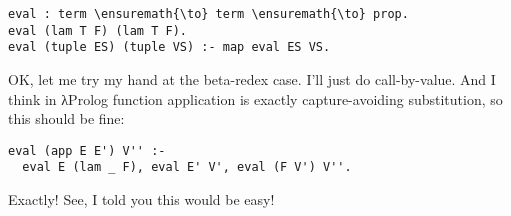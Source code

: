 \begin{verbatim}
eval : term \ensuremath{\to} term \ensuremath{\to} prop.
eval (lam T F) (lam T F).
eval (tuple ES) (tuple VS) :- map eval ES VS.
\end{verbatim}

\heroSTUDENT{} OK, let me try my hand at the beta-redex case. I'll just do
call-by-value. And I think in \foreignlanguage{greek}{λ}Prolog function application is exactly
capture-avoiding substitution, so this should be fine:

\begin{verbatim}
eval (app E E') V'' :-
  eval E (lam _ F), eval E' V', eval (F V') V''.
\end{verbatim}

\heroADVISOR{} Exactly! See, I told you this would be easy!
